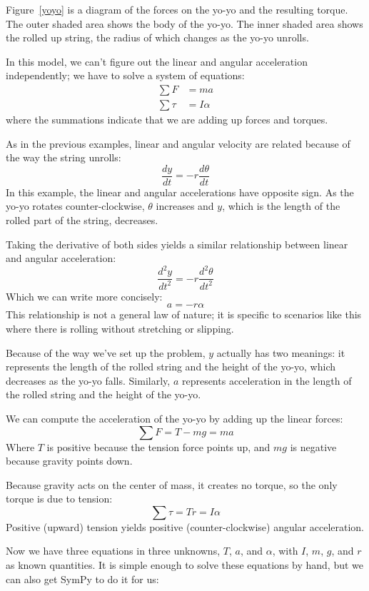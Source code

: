 \documentclass[12pt]{book}
\theoremstyle{exercise}
\begin{document}
Figure~\ref{yoyo} is a diagram of the forces on the yo-yo and the resulting torque.  The outer shaded area shows the body of the yo-yo.  The inner shaded area shows the rolled up string, the radius of which changes as the yo-yo unrolls.


In this model, we can't figure out the linear and angular acceleration independently; we have to solve a system of equations:
%
\begin{align*}
\sum F &= m a \\
\sum \tau &= I \alpha
\end{align*}
%
where the summations indicate that we are adding up forces and torques.

As in the previous examples, linear and angular velocity are related because of the way the string unrolls:
%
\[ \frac{dy}{dt} = -r \frac{d \theta}{dt} \]
%
In this example, the linear and angular accelerations have opposite sign.  As the yo-yo rotates counter-clockwise, $\theta$ increases and $y$, which is the length of the rolled part of the string, decreases.

Taking the derivative of both sides yields a similar relationship between linear and angular acceleration:
%
\[ \frac{d^2 y}{dt^2} = -r \frac{d^2 \theta}{dt^2} \]
%
Which we can write more concisely:
%
\[ a = -r \alpha \]
%
This relationship is not a general law of nature; it is specific to scenarios like this where there is rolling without stretching or slipping.


Because of the way we've set up the problem, $y$ actually has two meanings: it represents the length of the rolled string and the height of the yo-yo, which decreases as the yo-yo falls.  Similarly, $a$ represents acceleration in the length of the rolled string and the height of the yo-yo.

We can compute the acceleration of the yo-yo by adding up the linear forces:
%
\[ \sum F = T - mg = ma \]
%
Where $T$ is positive because the tension force points up, and $mg$ is negative because gravity points down.

Because gravity acts on the center of mass, it creates no torque, so the only torque is due to tension:
%
\[ \sum \tau = T r = I \alpha \]
%
Positive (upward) tension yields positive (counter-clockwise) angular acceleration.


Now we have three equations in three unknowns, $T$, $a$, and $\alpha$, with $I$, $m$, $g$, and $r$ as known quantities.  It is simple enough to solve these equations by hand, but we can also get SymPy to do it for us:
\end{document}
